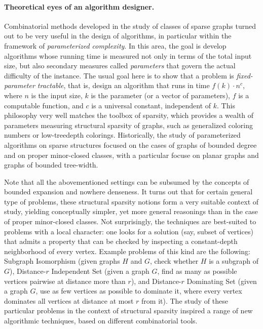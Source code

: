 \paragraph*{Theoretical eyes of an algorithm designer.} 
Combinatorial methods developed in the study of classes of sparse graphs turned out to be very useful in the design of algorithms, in particular within the framework of {\em{parameterized complexity}}.
In this area, the goal is develop algorithms whose running time is measured not only in terms of the total input size, but also secondary measures called {\em{parameters}} that govern the actual 
difficulty of the instance. The usual goal here is to show that a problem is {\em{fixed-parameter tractable}}, that is, 
design an algorithm that runs in time $f(k)\cdot n^c$, where $n$ is the input size, $k$ is the parameter (or a vector of parameters), 
$f$ is a computable function, and $c$ is a universal constant, independent of $k$.
This philosophy very well matches the toolbox of sparsity, which provides a wealth of parameters measuring structural sparsity of graphs, such as generalized coloring numbers or
low-treedepth colorings. Historically, the study of parameterized algorithms on sparse structures focused on the cases of graphs of bounded degree and on proper minor-closed classes, with a particular focuse on
planar graphs and graphs of bounded tree-width.

Note that all the abovementioned settings can be subsumed by the concepts of bounded expansion and nowhere denseness.
It turns out that for certain general type of problems, these structural sparsity notions form a very suitable context of study, yielding conceptually simpler, yet more general reasonings than 
in the case of proper minor-closed classes. Not surprisingly, the techniques are best-suited to problems with a local character:
one looks for a solution (say, subset of vertices) that admits a property that can be checked by inspecting a constant-depth neighborhood of every vertex.
Example problems of this kind are the following: Subgraph Isomorphism (given graphs $H$ and $G$, check whether $H$ is a subgraph of $G$), Distance-$r$ Independent Set (given a graph $G$, find as many as possible
vertices pairwise at distance more than $r$), and Distance-$r$ Dominating Set (given a graph $G$, use as few vertices as possible to dominate it, 
where every vertex dominates all vertices at distance at most $r$ from it).
The study of these particular problems in the context of structural sparsity inspired a range of new algorithmic techniques, based on different combinatorial tools.

